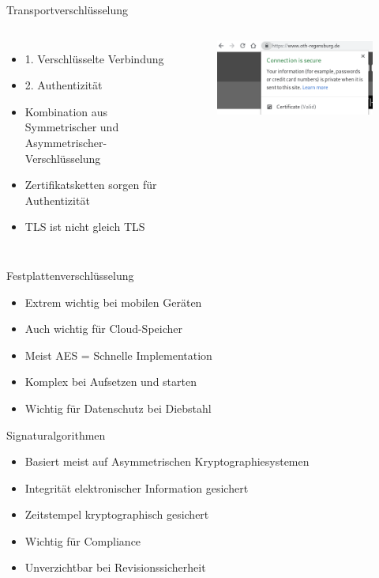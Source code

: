 \documentclass[10pt]{beamer}
\begin{document}
%
%
\begin{frame}[fragile]{Transportverschlüsselung}
\begin{columns}[T,c,onlytextwidth]
	\begin{itemize}
		\item 1. Verschlüsselte Verbindung
		\item 2. Authentizität
		\item Kombination aus Symmetrischer und Asymmetrischer-Verschlüsselung
		\item Zertifikatsketten sorgen für Authentizität
		\item TLS ist nicht gleich TLS
	\end{itemize}
	\begin{figure}
		\includegraphics[width=1\textwidth]{images/oth-key}
	\end{figure}
\end{columns}
\end{frame}

%
%
\begin{frame}[fragile]{Festplattenverschlüsselung}
	\begin{itemize}
	\item Extrem wichtig bei mobilen Geräten
	\item Auch wichtig für Cloud-Speicher
	\item Meist AES = Schnelle Implementation
	\item Komplex bei Aufsetzen und starten
	\item Wichtig für Datenschutz bei Diebstahl
\end{itemize}
\end{frame}

%
%
\begin{frame}[fragile]{Signaturalgorithmen}
	\begin{itemize}
	\item Basiert meist auf Asymmetrischen Kryptographiesystemen
	\item Integrität elektronischer Information gesichert
	\item Zeitstempel kryptographisch gesichert
	\item Wichtig für Compliance
	\item Unverzichtbar bei Revisionssicherheit
\end{itemize}
\end{frame}
\end{document}
